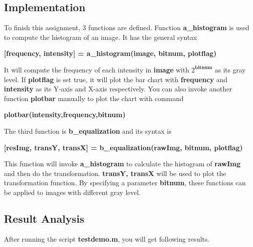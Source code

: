 \documentclass[11pt,a4paper]{article}
\begin{document}
\subsection{Implementation}
To finish this assignment, 3 functions are defined. Function \textbf{a\_histogram} is used to compute the 
histogram of an image. It has the general syntax
\begin{center}
	\textbf{[frequency, intensity] = a\_histogram(image, bitnum, plotflag)}
\end{center}
It will compute the frequency of each intensity in \textbf{image} with $2^\textbf{bitnum}$ as its gray 
level. If \textbf{plotflag} is set true, it will plot the bar chart with \textbf{frequency} and \textbf{intensity}
as its Y-axis and X-axis respectively. You can also invoke another function \textbf{plotbar} manually to 
plot the chart with command
\begin{center}
	\textbf{plotbar(intensity,frequency,bitnum)}
\end{center}
The third function is \textbf{b\_equalization} and its syntax is
\begin{center}
\textbf{[resImg, transY, transX] = b\_equalization(rawImg, bitnum, plotflag)}
\end{center}
This function will invoke \textbf{a\_histogram} to calculate the histogram of \textbf{rawImg}
and then do the transformation. \textbf{transY, transX} will be used to plot the transformation
function. By specifying a parameter \textbf{bitnum}, these functions can be applied to images 
with different gray level. %

\subsection{Result Analysis}
After running the script \textbf{testdemo.m}, you will get following results.
\end{document}

